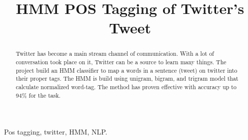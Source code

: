 \documentclass[conference,compsoc]{IEEEtran}
\begin{document}
%
\title{HMM POS Tagging of Twitter's Tweet}



% 
\author{
}




\maketitle


\begin{abstract}
Twitter has become a main stream channel of communication. With a lot of conversation took place on it, Twitter can be a source to learn many things. The project build an HMM classifier to map a words in a sentence (tweet) on twitter into their proper tags. The HMM is build using unigram, bigram, and trigram model that calculate normalized word-tag. The method has proven effective with accuracy up to 94\% for the task.
\end{abstract}

\begin{IEEEkeywords}
Pos tagging, twitter, HMM, NLP.
\end{IEEEkeywords}



%
\IEEEpeerreviewmaketitle
\end{document}
